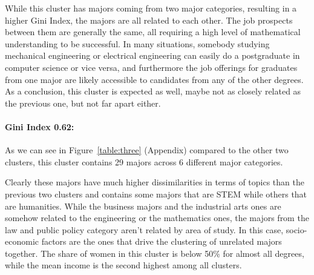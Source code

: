 \documentclass[11pt]{article}
\begin{document}
While this cluster has majors coming from two major categories, resulting in a higher Gini Index, the majors are all related to each other. The job prospects between them are generally the same, all requiring a high level of mathematical understanding to be successful. In many situations, somebody studying mechanical engineering or electrical engineering can easily do a postgraduate in computer science or vice versa, and furthermore the job offerings for graduates from one major are likely accessible to candidates from any of the other degrees. As a conclusion, this cluster is expected as well, maybe not as closely related as the previous one, but not far apart either.

\paragraph*{Gini Index 0.62:}As we can see in Figure~\ref{table:three} (Appendix) compared to the other two clusters, this cluster contains 29 majors across 6 different major categories.


Clearly these majors have much higher dissimilarities in terms of topics than the previous two clusters and contains some majors that are STEM while others that are humanities. While the business majors and the industrial arts ones are somehow related to the engineering or the mathematics ones, the majors from the law and public policy category aren't related by area of study. In this case, socio-economic factors are the ones that drive the clustering of unrelated majors together. The share of women in this cluster is below 50\% for almost all degrees, while the mean income is the second highest among all clusters.  
\end{document}
